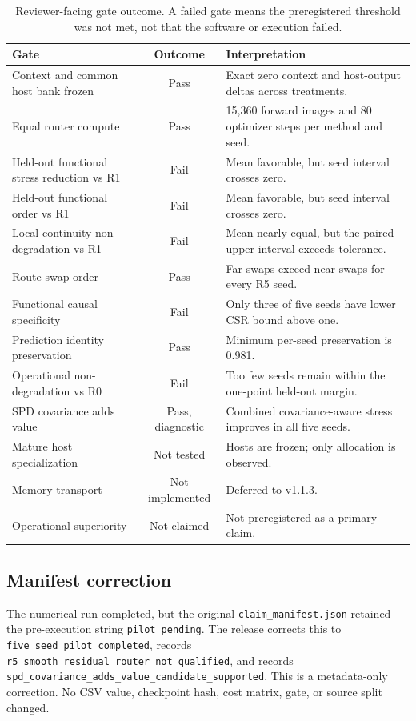 \documentclass[11pt,a4paper]{article}
\begin{document}
\begin{table}[H]
\centering
\caption{Reviewer-facing gate outcome. A failed gate means the preregistered threshold was not met, not that the software or execution failed.}
\label{tab:gates}
\small
\begin{tabularx}{\textwidth}{@{}Y c Y@{}}
\toprule
Gate & Outcome & Interpretation \\
\midrule
Context and common host bank frozen & Pass & Exact zero context and host-output deltas across treatments. \\
Equal router compute & Pass & 15,360 forward images and 80 optimizer steps per method and seed. \\
Held-out functional stress reduction vs R1 & Fail & Mean favorable, but seed interval crosses zero. \\
Held-out functional order vs R1 & Fail & Mean favorable, but seed interval crosses zero. \\
Local continuity non-degradation vs R1 & Fail & Mean nearly equal, but the paired upper interval exceeds tolerance. \\
Route-swap order & Pass & Far swaps exceed near swaps for every R5 seed. \\
Functional causal specificity & Fail & Only three of five seeds have lower CSR bound above one. \\
Prediction identity preservation & Pass & Minimum per-seed preservation is 0.981. \\
Operational non-degradation vs R0 & Fail & Too few seeds remain within the one-point held-out margin. \\
SPD covariance adds value & Pass, diagnostic & Combined covariance-aware stress improves in all five seeds. \\
Mature host specialization & Not tested & Hosts are frozen; only allocation is observed. \\
Memory transport & Not implemented & Deferred to v1.1.3. \\
Operational superiority & Not claimed & Not preregistered as a primary claim. \\
\bottomrule
\end{tabularx}
\end{table}

\subsection{Manifest correction}
The numerical run completed, but the original \texttt{claim\_manifest.json} retained the pre-execution string \texttt{pilot\_pending}. The release corrects this to \texttt{five\_seed\_pilot\_completed}, records \texttt{r5\_smooth\_residual\_router\_not\_qualified}, and records \texttt{spd\_covariance\_adds\_value\_candidate\_supported}. This is a metadata-only correction. No CSV value, checkpoint hash, cost matrix, gate, or source split changed.
\end{document}
